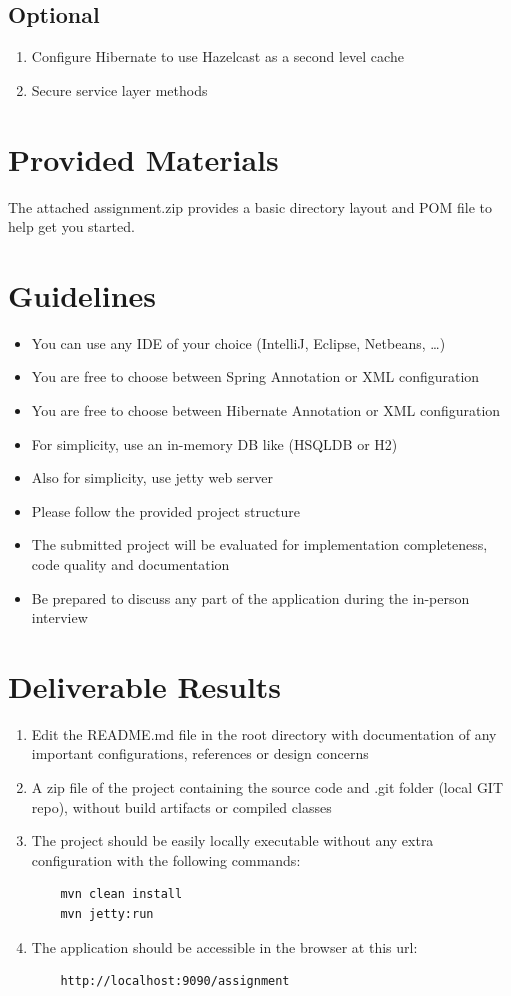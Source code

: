 \documentclass[12pt, onecolumn]{article}
\begin{document}
\subsection{Optional}
\begin{enumerate}
\item Configure Hibernate to use Hazelcast as a second level cache
\item Secure service layer methods
\end{enumerate}
\section{Provided Materials}
The attached assignment.zip provides a basic directory layout and POM file to help get you started.
\section{Guidelines}
\begin{itemize}
	\item You can use any IDE of your choice (IntelliJ, Eclipse, Netbeans, \ldots)
	\item You are free to choose between Spring Annotation or XML configuration
	\item You are free to choose between Hibernate Annotation or XML configuration
	\item For simplicity, use an in-memory DB like (HSQLDB or H2)
	\item Also for simplicity, use jetty web server
	\item Please follow the provided project structure
	\item The submitted project will be evaluated for implementation completeness, code quality and documentation
	\item Be prepared to discuss any part of the application during the in-person interview
\end{itemize}
\section{Deliverable Results}
\begin{enumerate}
	\item Edit the README.md file in the root directory with documentation of any important configurations, references or design concerns
	\item A zip file of the project containing the source code and .git folder (local GIT repo), without build artifacts or compiled classes
	\item The project should be easily locally executable without any extra configuration with the following commands:
	\begin{lstlisting}
	mvn clean install
	mvn jetty:run
	\end{lstlisting}
	\item The application should be accessible in the browser at this url: 
	\begin{lstlisting}
	http://localhost:9090/assignment
	\end{lstlisting}
\end{enumerate}
\end{document}
